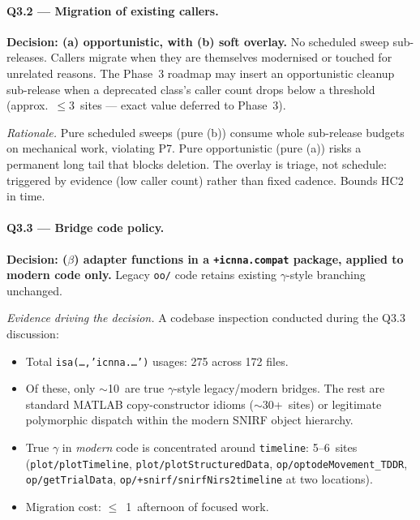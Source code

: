 \documentclass[11pt,a4paper]{article}
\begin{document}
\paragraph{Q3.2 --- Migration of existing callers.}
\textbf{Decision: (a) opportunistic, with (b) soft overlay.} No scheduled sweep sub-releases. Callers migrate when they are themselves modernised or touched for unrelated reasons. The Phase~3 roadmap may insert an opportunistic cleanup sub-release when a deprecated class's caller count drops below a threshold (approx.\ $\leq 3$~sites --- exact value deferred to Phase~3).

\textit{Rationale.} Pure scheduled sweeps (pure (b)) consume whole sub-release budgets on mechanical work, violating P7. Pure opportunistic (pure (a)) risks a permanent long tail that blocks deletion. The overlay is triage, not schedule: triggered by evidence (low caller count) rather than fixed cadence. Bounds HC2 in time.

\paragraph{Q3.3 --- Bridge code policy.}
\textbf{Decision: ($\beta$) adapter functions in a \texttt{+icnna.compat} package, applied to modern code only.} Legacy \texttt{oo/} code retains existing $\gamma$-style branching unchanged.

\textit{Evidence driving the decision.} A codebase inspection conducted during the Q3.3 discussion:
\begin{itemize}
    \item Total \texttt{isa(\dots,'icnna.\dots')} usages: 275 across 172 files.
    \item Of these, only $\sim$10~are true $\gamma$-style legacy/modern bridges. The rest are standard MATLAB copy-constructor idioms ($\sim$30+~sites) or legitimate polymorphic dispatch within the modern SNIRF object hierarchy.
    \item True $\gamma$ in \emph{modern} code is concentrated around \texttt{timeline}: 5--6~sites (\texttt{plot/plotTimeline}, \texttt{plot/plotStructuredData}, \texttt{op/optodeMovement\_TDDR}, \texttt{op/getTrialData}, \texttt{op/+snirf/snirfNirs2timeline} at two locations).
    \item Migration cost: $\leq$~1~afternoon of focused work.
\end{itemize}
\end{document}
